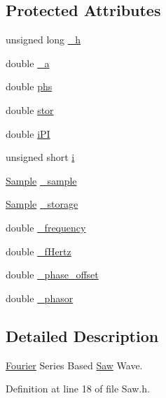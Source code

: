 \subsection*{Protected Attributes}
\begin{DoxyCompactItemize}
\item 
unsigned long \hyperlink{classSignal_1_1Fourier_1_1Saw_a7e796347f04f0f4370a472587701b82b}{\+\_\+h}
\item 
double \hyperlink{classSignal_1_1Fourier_1_1Saw_af31172dae9d5fcd2fcdb0adb7c41bacf}{\+\_\+a}
\item 
double \hyperlink{classSignal_1_1Fourier_1_1Saw_a3c26ea58f2340c1d9a296937cec78a86}{phs}
\item 
double \hyperlink{classSignal_1_1Fourier_1_1Saw_a31859d02406add22e072936c33f386af}{stor}
\item 
double \hyperlink{classSignal_1_1Fourier_1_1Saw_a70dccb676ad58a1b6ef4b053081bec3f}{i\+P\+I}
\item 
unsigned short \hyperlink{classSignal_1_1Fourier_1_1Saw_a1e575a999b316e51cb3a4f8af962749c}{i}
\item 
\hyperlink{classSignal_1_1Sample}{Sample} \hyperlink{classSignal_1_1Fourier_1_1FourierGenerator_ad720bf2b268dc621ace64c54c0816597}{\+\_\+sample}
\item 
\hyperlink{classSignal_1_1Sample}{Sample} \hyperlink{classSignal_1_1Fourier_1_1FourierGenerator_ab6e6b79cf56e31c9a1b5766f357f8cfb}{\+\_\+storage}
\item 
double \hyperlink{classSignal_1_1SignalGenerator_a7f107461333bce68c5dad412db96a8c2}{\+\_\+frequency}
\item 
double \hyperlink{classSignal_1_1SignalGenerator_a85a4702347352bab1c71e0a8df8437d6}{\+\_\+f\+Hertz}
\item 
double \hyperlink{classSignal_1_1SignalGenerator_a6b4444d46747c8517171edbbf4b5588f}{\+\_\+phase\+\_\+offset}
\item 
double \hyperlink{classSignal_1_1SignalGenerator_af4aa0728ded00777be26a06d883eaeb3}{\+\_\+phasor}
\end{DoxyCompactItemize}


\subsection{Detailed Description}
\hyperlink{namespaceSignal_1_1Fourier}{Fourier} Series Based \hyperlink{classSignal_1_1Fourier_1_1Saw}{Saw} Wave. 

Definition at line 18 of file Saw.\+h.



